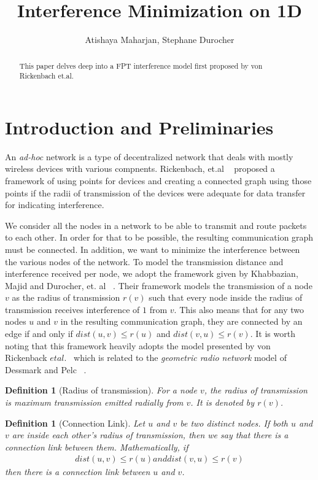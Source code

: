 \documentclass{article}
\title{Interference Minimization on 1D}
\author{Atishaya Maharjan, Stephane Durocher}
\newtheorem{definition}[theorem]{Definition}
\begin{document}
\maketitle

\begin{abstract}
	This paper delves deep into a FPT interference model first proposed by von Rickenbach et.al. 
\end{abstract}

\section{Introduction and Preliminaries}

An \textit{ad-hoc} network is a type of decentralized network that deals with mostly wireless devices with various compnents. Rickenbach, et.al ~\cite{1420165} proposed a framework of using points for devices and creating a connected graph using those points if the radii of transmission of the devices were adequate for data transfer for indicating interference.

We consider all the nodes in a network to be able to transmit and route packets to each other. In order for that to be possible, the resulting communication graph must be connected. In addition, we want to minimize the interference between the various nodes of the network. To model the transmission distance and interference received per node, we adopt the framework given by  Khabbazian, Majid and Durocher, et. al ~\cite{6809218}. Their framework models the transmission of a node $v$ as the radius of transmission $r(v)$ such that every node inside the radius of transmission receives interference of $1$ from $v$. This also means that for any two nodes $u$ and $v$ in the resulting communication graph, they are connected by an edge if and only if $dist(u, v) \leq r(u)$ and $dist(v, u) \leq r(v)$. It is worth noting that this framework heavily adopts the model presented by von Rickenback $et al.$~\cite{1420165} which is related to the \textit{geometric radio network} model of Dessmark and Pelc ~\cite{DessmarkAnders2001Tbka}.

\begin{definition}[Radius of transmission]
	For a node $v$, the radius of transmission is maximum transmission emitted radially from $v$. It is denoted by $r(v)$.
\end{definition}

\begin{definition}[Connection Link]
	Let $u$ and $v$ be two distinct nodes. If both $u$ and $v$ are inside each other's radius of transmission, then we say that there is a connection link between them. Mathematically, if 
	\begin{align*}
		dist(u,v) \leq r(u) and dist(v, u) \leq r(v) 
	\end{align*}
	then there is a connection link between $u$ and $v$.
\end{definition}
\end{document}
